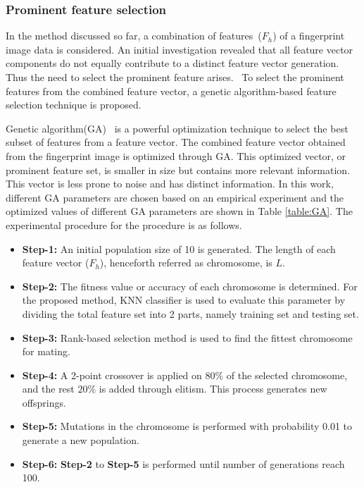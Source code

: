 \subsubsection{Prominent feature selection}
In the method discussed so far, a combination of features~($F_{h}$) of a
fingerprint image data is considered. An initial investigation revealed that all
feature vector components do not equally contribute to a distinct
feature vector generation. Thus the need to select the prominent feature
arises. ~To select the prominent features from the
combined feature vector, a genetic algorithm-based feature selection technique
is proposed.

\par

Genetic algorithm(GA)~\cite{chiesa2020gars,alirezazadeh2015genetic} is a
powerful optimization technique to select the best subset of features from a
feature vector. The combined feature vector obtained from the fingerprint image
is optimized through GA. This optimized vector, or prominent feature set, is
smaller in size but contains more relevant information. This vector is less prone
to noise and has distinct information. In this work, different GA parameters
are chosen based on an empirical experiment and the optimized values of
different GA parameters are shown in
Table \ref{table:GA}. The experimental procedure for the procedure is as follows.

\begin{itemize}
	\item \textbf{Step-1:} An initial population size of 10 is generated. The
	      length of each feature vector ($F_{h}$), henceforth referred as chromosome, is $L$.
	\item \textbf{Step-2:} The fitness value or accuracy of each chromosome is
	      determined. For the proposed method, KNN classifier is used to
	      evaluate this parameter by dividing the total feature set into 2
	      parts, namely training set and testing set.
	\item \textbf{Step-3:} Rank-based selection method is used to find the
	      fittest chromosome for mating.
	\item \textbf{Step-4:} A 2-point crossover is applied on $80 \% $ of the
	      selected chromosome, and the rest  $20 \%$  is added through elitism. This
	      process generates new offsprings.
	\item \textbf{Step-5:} Mutations in the chromosome is performed with
	      probability 0.01 to generate a new population.
	\item \textbf{Step-6:} \textbf{Step-2} to \textbf{Step-5} is performed until number of generations reach 100.
\end{itemize}

